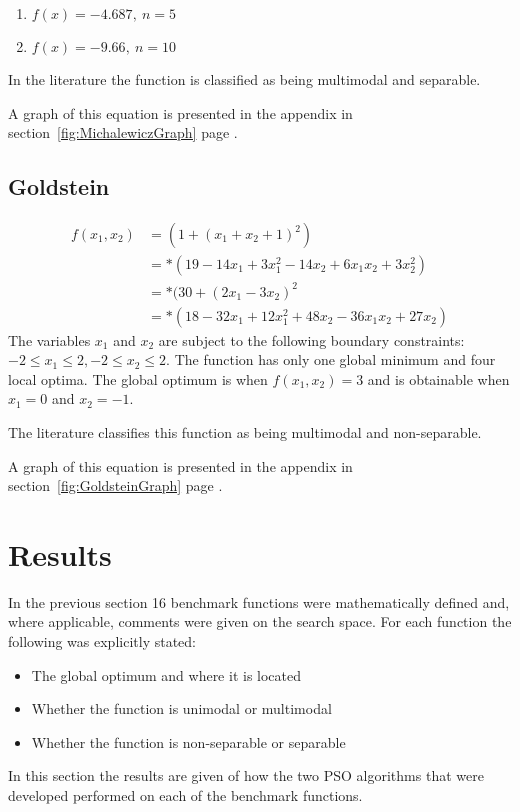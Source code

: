 \begin{enumerate}
\item $f(x) = -4.687,\: n = 5$
\item $f(x) = -9.66,\: n = 10$
\end{enumerate}
In the literature the function is classified as being multimodal and separable\cite{ABCCompareStudy}.

A graph of this equation is presented in the appendix in section~\ref{fig:MichalewiczGraph} page \pageref{fig:MichalewiczGraph}.
\subsection{Goldstein}
\begin{align}
	f(x_1,x_2) &= (1 + (x_1 + x_2 + 1)^2)\nonumber\\
			   &=*(19-14x_1+3x_1^2 -14x_2 + 6x_1x_2 + 3x_2^2)\nonumber\\
			   &=*(30 + (2x_1 -3x_2)^2\nonumber\\
			   &=*(18 - 32x_1 + 12x_1^2 +48x_2 -36x_1x_2 + 27x_2)\nonumber
\end{align}
The variables $x_1$ and $x_2$ are subject to the following boundary constraints: $-2 \leq x_1 \leq 2, -2 \leq x_2 \leq 2$\cite{ABCCompareStudy,TSGlobalOptimization,TSGlobalOptContinFunc,ContinACSTS,TestFunctions}. The function has only one global minimum and four local optima\cite{ABCCompareStudy,TSGlobalOptimization}. The global optimum is when $f(x_1,x_2) = 3$ and is obtainable when $x_1 = 0$ and $x_2 = -1$\cite{ABCCompareStudy,TSGlobalOptimization,TSGlobalOptContinFunc,ContinACSTS,TestFunctions}.

The literature classifies this function as being multimodal and non-separable\cite{ABCCompareStudy}.

A graph of this equation is presented in the appendix in section~\ref{fig:GoldsteinGraph} page \pageref{fig:GoldsteinGraph}.

\section{Results}
\label{sec:benchResults}
In the previous section 16 benchmark functions were mathematically defined and, where applicable, comments were given on the search space. For each function the following was explicitly stated:
\begin{itemize}
\item The global optimum and where it is located
\item Whether the function is unimodal or multimodal
\item Whether the function is non-separable or separable
\end{itemize}
In this section the results are given of how the two PSO algorithms that were developed performed on each of the benchmark functions. 

